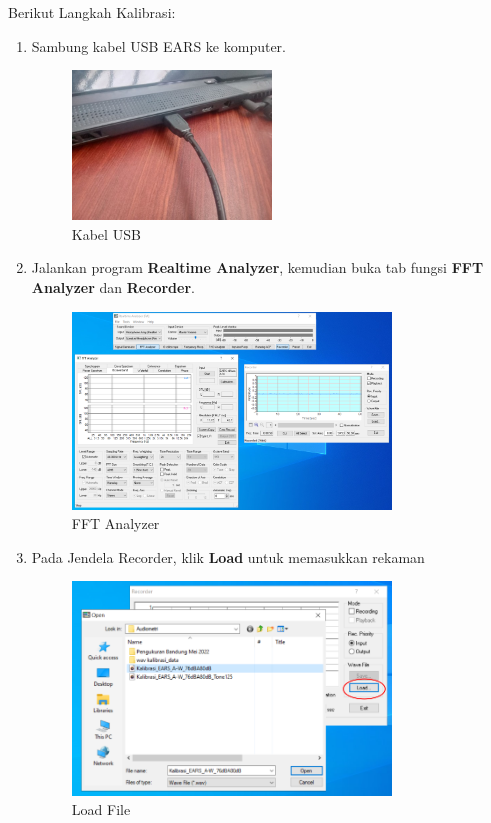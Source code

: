 \documentclass[12pt]{book}
\begin{document}
	Berikut Langkah Kalibrasi:
	\begin{enumerate}
		\item Sambung kabel USB EARS ke komputer.
		\begin{figure}[!ht]
			\centering
			\includegraphics[width=0.5\textwidth]{images/dssf3/laptop_ears}
			\caption{Kabel USB}
		\end{figure}

		\newpage
		\item Jalankan program \textbf{Realtime Analyzer}, kemudian buka tab fungsi \textbf{FFT Analyzer} dan \textbf{Recorder}.
		\begin{figure}[!ht]
			\centering
			\includegraphics[width=0.8\textwidth]{images/dssf3/fft_analyzer}
			\caption{FFT Analyzer}
		\end{figure}

		\item Pada Jendela Recorder, klik \textbf{Load} untuk memasukkan rekaman
		\begin{figure}[!ht]
			\centering
			\includegraphics[width=0.8\textwidth]{images/dssf3/load_file}
			\caption{Load File}
		\end{figure}


\end{enumerate}
\end{document}

